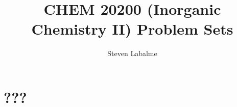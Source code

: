 \documentclass[titlepage]{article}
\title{CHEM 20200 (Inorganic Chemistry II) Problem Sets}
\author{Steven Labalme}
\begin{document}
\maketitle



\tableofcontents
\newpage



\pagestyle{main}
\renewcommand{\leftmark}{Homework \thesection}
\section{???}

\end{document}
